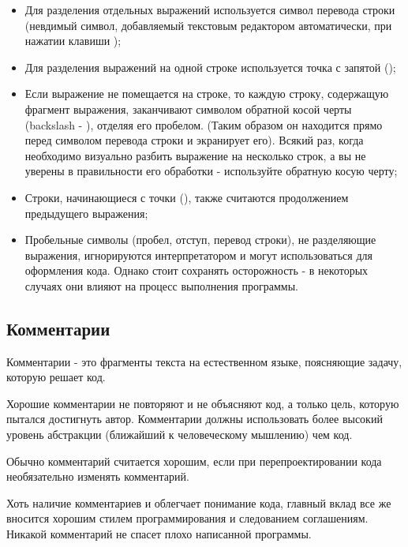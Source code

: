 \begin{itemize}
  \item Для разделения отдельных выражений используется символ перевода строки (невдимый символ, добавляемый текстовым редактором автоматически, при нажатии клавиши );

  \item Для разделения выражений на одной строке используется точка с запятой (\mono{;});

  \item Если выражение не помещается на строке, то каждую строку, содержащую фрагмент выражения, заканчивают символом обратной косой черты (backslash - \mono{\textbackslash}), отделяя его пробелом. (Таким образом он находится прямо перед символом перевода строки и экранирует его). Всякий раз, когда необходимо визуально разбить выражение на несколько строк, а вы не уверены в правильности его обработки - используйте обратную косую черту;

  \item Строки, начинающиеся с точки (), также считаются продолжением предыдущего выражения;

  \item Пробельные символы (пробел, отступ, перевод строки), не разделяющие выражения, игнорируются интерпретатором и могут использоваться для оформления кода. Однако стоит сохранять осторожность - в некоторых случаях они влияют на процесс выполнения программы.
\end{itemize}

\subsection{Комментарии}

Комментарии - это фрагменты текста на естественном языке, поясняющие задачу, которую решает код. 

Хорошие комментарии не повторяют и не объясняют код, а только цель, которую пытался достигнуть автор. Комментарии должны использовать более высокий уровень абстракции (ближайший к человеческому мышлению) чем код.

Обычно комментарий считается хорошим, если при перепроектировании кода необязательно изменять комментарий.

Хоть наличие комментариев и облегчает понимание кода, главный вклад все же вносится хорошим стилем программирования и следованием соглашениям. Никакой комментарий не спасет плохо написанной программы.

